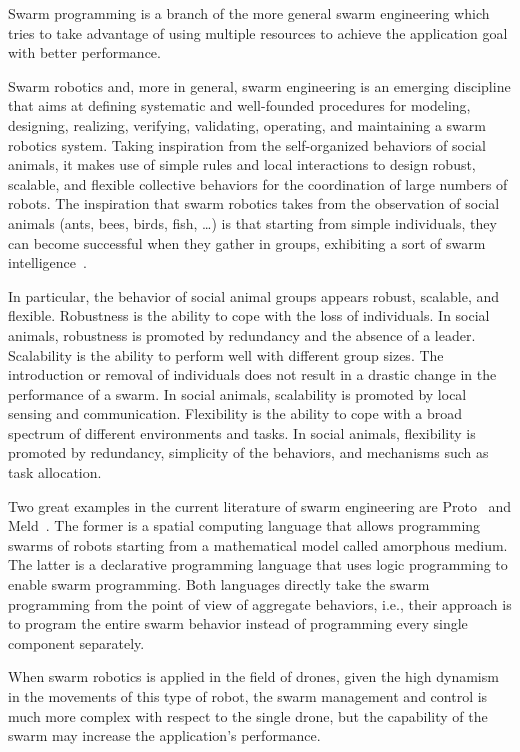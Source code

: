 Swarm programming is a branch of the more general swarm engineering which tries to take advantage of using multiple resources to 
achieve the application goal with better performance.

Swarm robotics and, more in general, swarm engineering is an emerging discipline that aims at defining systematic 
and well-founded procedures for modeling, designing, realizing, verifying, validating, operating, and maintaining 
a swarm robotics system. Taking inspiration from the self-organized behaviors of social animals, it makes use of simple 
rules and local interactions to design robust, scalable, and flexible collective behaviors for the coordination of large numbers of robots.
The inspiration that swarm robotics takes from the observation of social animals (ants, bees, birds, fish, …) is that starting from simple individuals,
they can become successful when they gather in groups, exhibiting a sort of swarm intelligence~\cite{bonabeau1999swarm}.

In particular, the behavior of social animal groups appears robust, scalable, and flexible. 
Robustness is the ability to cope with the loss of individuals. 
In social animals, robustness is promoted by redundancy and the absence of a leader. 
Scalability is the ability to perform well with different group sizes. 
The introduction or removal of individuals does not result in a drastic change in the performance of a swarm. 
In social animals, scalability is promoted by local sensing and communication. 
Flexibility is the ability to cope with a broad spectrum of different environments and tasks. 
In social animals, flexibility is promoted by redundancy, simplicity of the behaviors, and mechanisms such as task allocation.

Two great examples in the current literature of swarm engineering are Proto~\cite{bachrach2010proto} and Meld~\cite{ashley2007meld}. 
The former is a spatial computing language that allows programming swarms of robots starting from a mathematical model called amorphous medium.
The latter is a declarative programming language that uses logic programming to enable swarm programming.
Both languages directly take the swarm programming from the point of view of aggregate behaviors, i.e., their approach is to program the entire
swarm behavior instead of programming every single component separately.

When swarm robotics is applied in the field of drones, given the high dynamism in the movements of this type of robot, 
the swarm management and control is much more complex with respect to the single drone, 
but the capability of the swarm may increase the application's performance.

